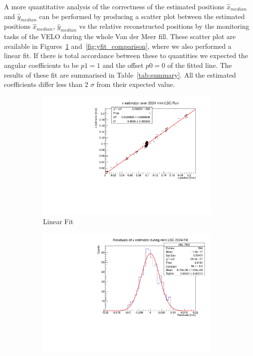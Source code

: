 A more quantitative analysis of the correctness of the estimated positions $\hat{x}_{median}$ and $\hat{y}_{median}$ can be performed by producing a scatter plot between the estimated positions $\hat{x}_{median}$, $\hat{y}_{median}$ vs the relative reconstructed positions by the monitoring tasks of the VELO during the whole Van der Meer fill. These scatter plot are available in Figures~\ref{fig:xfit_comparison} and~\ref{fig:yfit_comparison}, where we also performed a linear fit. If there is total accordance between these to quantities we expected the angular coefficients to be $p1=1$ and the offset $p0=0$ of the fitted line. 
The results of these fit are summarised in Table~\ref{tab:summary}. All the estimated coefficients differ less than 2 $\sigma$ from their expected value. 


\begin{figure}
    \centering
    \begin{subfigure}{0.48\textwidth}
    \includegraphics[width=\linewidth]{figures/x_comparison_side.pdf}
    \caption{Linear Fit}\label{fig:xfit_comparison}
    \end{subfigure}
    \begin{subfigure}{0.48\textwidth}
    \includegraphics[width=\linewidth]{figures/x_comparison_res_side.pdf}

\end{subfigure}
\end{figure}

